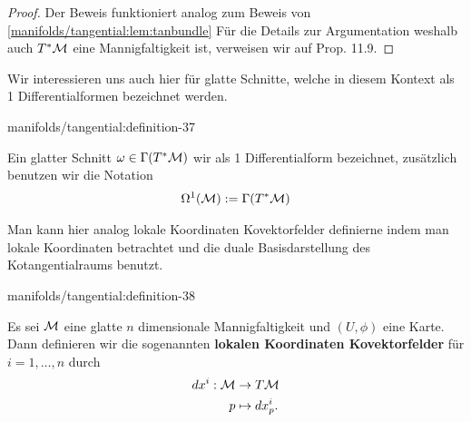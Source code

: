 \begin{proof}
 Der Beweis funktioniert analog zum Beweis von \cref{manifolds/tangential:lem:tanbundle}  Für die Details zur Argumentation weshalb auch \(T^\ast\mathcal{M}\) eine Mannigfaltigkeit ist, verweisen wir auf \cite{Lee03} Prop. 11.9.
\end{proof}

\par
Wir interessieren uns auch hier für glatte Schnitte, welche in diesem Kontext als 1 Differentialformen bezeichnet werden.
\begin{definition}{}{manifolds/tangential:definition-37}



\par
Ein glatter Schnitt \(\omega\in\Gamma(T^\ast\mathcal{M})\) wir als 1 Differentialform bezeichnet, zusätzlich benutzen wir die Notation
\begin{align*}
\Omega^1(\mathcal{M}) := \Gamma(T^\ast\mathcal{M})
\end{align*}\end{definition}

\par
Man kann hier analog lokale Koordinaten Kovektorfelder definierne indem man lokale Koordinaten betrachtet und die duale Basisdarstellung des Kotangentialraums benutzt.
\begin{definition}{}{manifolds/tangential:definition-38}



\par
Es sei \(\mathcal{M}\) eine glatte \(n\) dimensionale Mannigfaltigkeit und \((U,\phi)\) eine Karte.
Dann definieren wir die sogenannten \textbf{lokalen Koordinaten Kovektorfelder} für \(i=1,\ldots,n\) durch
\begin{align*}
dx^{i}:\mathcal{M}&\to T\mathcal{M}\\
p&\mapsto dx^{i}_p.\end{align*}\end{definition}

